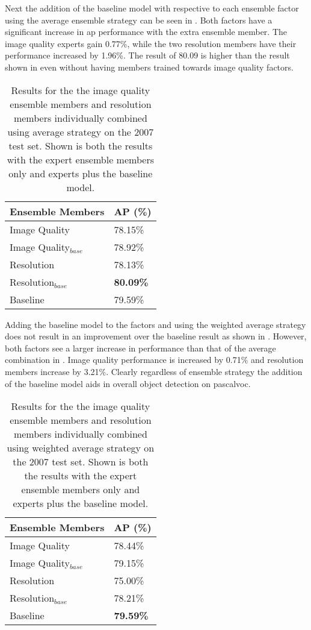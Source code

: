 \documentclass[a4paper,twoside]{article}
\begin{document}
Next the addition of the baseline model with respective to each ensemble factor using the average ensemble strategy can be seen in . Both factors have a significant increase in \gls{ap} performance with the extra ensemble member. The image quality experts gain 0.77\%, while the two resolution members have their performance increased by 1.96\%. The result of 80.09 is higher than the result shown in  even without having members trained towards image quality factors.

\begin{table}[h]
\centering
\caption{Results for the the image quality ensemble members and resolution members individually combined using average strategy on the 2007 test set. Shown is both the results with the expert ensemble members only and experts plus the baseline model.}
\label{tab:ensembleavg_base}
\begin{tabular}{|l|l|}
\hline
\textbf{Ensemble Members}        & \textbf{AP (\%)} \\ \hline
Image Quality & 78.15\% \\ \hline
Image Quality$_{base}$ & 78.92\% \\ \hline
Resolution    & 78.13\% \\ \hline
Resolution$_{base}$    & \textbf{80.09\%} \\ \hline
Baseline         & 79.59\% \\ \hline
\end{tabular}
\end{table}

Adding the baseline model to the factors and using the weighted average strategy does not result in an improvement over the baseline result as shown in . However, both factors see a larger increase in performance than that of the average combination in . Image quality performance is increased by 0.71\% and resolution members increase by 3.21\%. Clearly regardless of ensemble strategy the addition of the baseline model aids in overall object detection on \gls{pascalvoc}.

\begin{table}[h]
\centering
\caption{Results for the the image quality ensemble members and resolution members individually combined using weighted average strategy on the 2007 test set.  Shown is both the results with the expert ensemble members only and experts plus the baseline model.}
\label{tab:ensemblewavg_base}
\begin{tabular}{|l|l|}
\hline
\textbf{Ensemble Members}        & \textbf{AP (\%)} \\ \hline
Image Quality & 78.44\% \\ \hline
Image Quality$_{base}$ & 79.15\% \\ \hline
Resolution    & 75.00\% \\ \hline
Resolution$_{base}$    & 78.21\% \\ \hline
Baseline         & \textbf{79.59\%} \\ \hline
\end{tabular}
\end{table}
\end{document}
